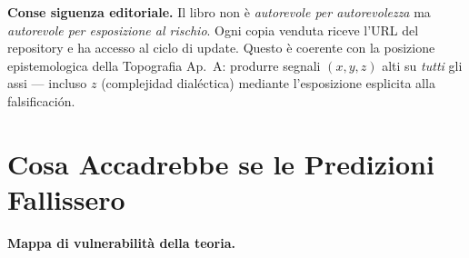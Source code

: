 \Proved{} \textbf{Conse siguenza editoriale.} Il libro non è
\emph{autorevole per autorevolezza} ma \emph{autorevole per esposizione
al rischio}. Ogni copia venduta riceve l'URL del repository e ha accesso
al ciclo di update. Questo è coerente con la posizione epistemologica
della Topografia Ap.~A: produrre segnali \((x, y, z)\) alti su
\emph{tutti} gli assi --- incluso \(z\) (complejidad dialéctica) mediante
l'esposizione esplicita alla falsificación.



\section{Cosa Accadrebbe se le Predizioni
Fallissero}\label{cosa-accadrebbe-se-le-predizioni-fallissero}

\Hypoth{} \textbf{Mappa di vulnerabilità della teoria.}

